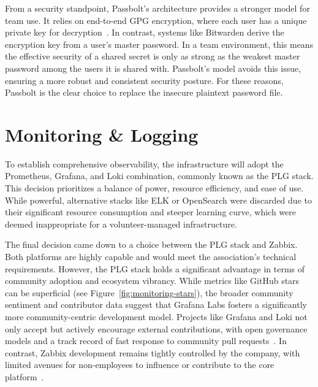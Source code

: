 From a security standpoint, Passbolt's architecture provides a stronger model for team use. It relies on end-to-end GPG encryption, where each user has a unique private key for decryption~\cite{passbolt-security}. In contrast, systems like Bitwarden derive the encryption key from a user's master password. In a team environment, this means the effective security of a shared secret is only as strong as the weakest master password among the users it is shared with. Passbolt's model avoids this issue, ensuring a more robust and consistent security posture. For these reasons, Passbolt is the clear choice to replace the insecure plaintext password file.

\section{Monitoring \& Logging}

To establish comprehensive observability, the infrastructure will adopt the Prometheus, Grafana, and Loki combination, commonly known as the PLG stack. This decision prioritizes a balance of power, resource efficiency, and ease of use. While powerful, alternative stacks like ELK or OpenSearch were discarded due to their significant resource consumption and steeper learning curve, which were deemed inappropriate for a volunteer-managed infrastructure.

The final decision came down to a choice between the PLG stack and Zabbix. Both platforms are highly capable and would meet the association's technical requirements. However, the PLG stack holds a significant advantage in terms of community adoption and ecosystem vibrancy. While metrics like GitHub stars can be superficial (see Figure~\ref{fig:monitoring-stars}), the broader community sentiment and contributor data suggest that Grafana Labs fosters a significantly more community-centric development model. Projects like Grafana and Loki not only accept but actively encourage external contributions, with open governance models and a track record of fast response to community pull requests~\cite{collab-grafana}. In contrast, Zabbix development remains tightly controlled by the company, with limited avenues for non-employees to influence or contribute to the core platform~\cite{zabbix-dev-policy}.

